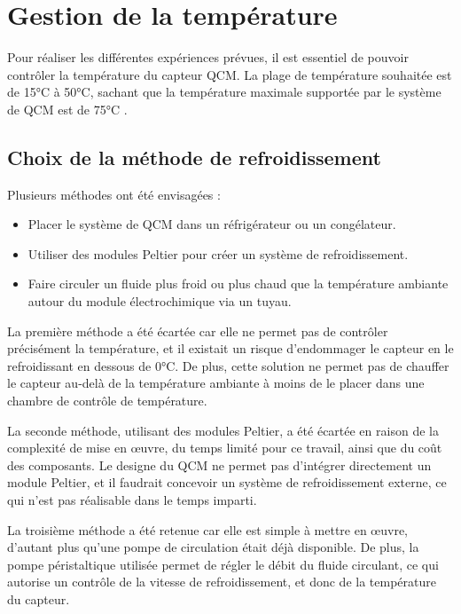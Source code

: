 \chapter{Gestion de la température}
\label{chap:Gestion de la température}
Pour réaliser les différentes expériences prévues, il est essentiel de pouvoir contrôler la température du capteur QCM.  
La plage de température souhaitée est de 15°C à 50°C, sachant que la température maximale supportée par le système de QCM est de 75°C \cite{manual-openqcmQ1}.

\section{Choix de la méthode de refroidissement}

Plusieurs méthodes ont été envisagées :
\begin{itemize}[label=\textbullet]
    \item Placer le système de QCM dans un réfrigérateur ou un congélateur.
    \item Utiliser des modules Peltier pour créer un système de refroidissement.
    \item Faire circuler un fluide plus froid ou plus chaud que la température ambiante autour du module électrochimique via un tuyau.
\end{itemize}

La première méthode a été écartée car elle ne permet pas de contrôler précisément la température, et il existait un risque d’endommager le capteur en le refroidissant en dessous de 0°C. De plus, cette solution ne permet pas de chauffer le capteur au-delà de la température ambiante à moins de le placer dans une chambre de contrôle de température.  

La seconde méthode, utilisant des modules Peltier, a été écartée en raison de la complexité de mise en œuvre, du temps limité pour ce travail, ainsi que du coût des composants. Le designe du QCM ne permet pas d’intégrer directement un module Peltier, et il faudrait concevoir un système de refroidissement externe, ce qui n’est pas réalisable dans le temps imparti.

La troisième méthode a été retenue car elle est simple à mettre en œuvre, d’autant plus qu’une pompe de circulation était déjà disponible. De plus, la pompe péristaltique utilisée permet de régler le débit du fluide circulant, ce qui autorise un contrôle de la vitesse de refroidissement, et donc de la température du capteur.


\newpage
